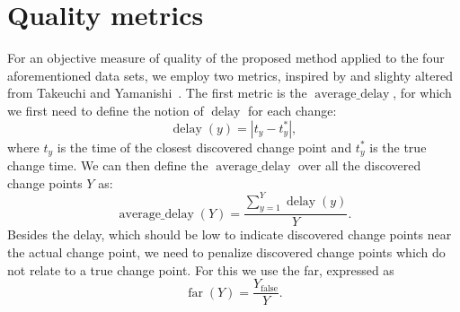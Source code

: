 \section{Quality metrics}\label{sec:artificial_data_quality_metrics}
For an objective measure of quality of the proposed method applied to the four aforementioned data sets, we employ two metrics, inspired by and slighty altered from Takeuchi and Yamanishi~\cite{takeuchi2006unifying}.
The first metric is the $\operatorname*{average \_ delay}$, for which we first need to define the notion of $\operatorname*{delay}$ for each change:
\begin{equation}\label{eq:delay}
  \operatorname*{delay}(y) = |t_y - t_y^*|,
\end{equation}
where $t_y$ is the time of the closest discovered change point and $t_y^*$ is the true change time.
We can then define the $\operatorname*{average \_ delay}$ over all the discovered change points $Y$ as:
\begin{equation}\label{eq:average_delay}
  \operatorname*{average \_ delay}(Y) = \frac{\sum_{y=1}^Y \operatorname*{delay}(y)}{Y}.
\end{equation}
Besides the delay, which should be low to indicate discovered change points near the actual change point, we need to penalize discovered change points which do not relate to a true change point.
For this we use the \acrlong{far}, expressed as
\begin{equation}\label{eq:false_alarm_rate}
  \operatorname*{far}(Y) = \frac{Y_{\operatorname*{false}}}{Y}.
\end{equation}

